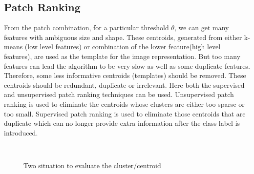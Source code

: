 \subsection{Patch Ranking}

From the patch combination, for a particular threshold $\theta$, we can get many features with ambiguous size and shape. These centroids, generated from either k-means (low level features) or combination of the lower feature(high level features), are used as the template for the image representation. But too many features can lead the algorithm to be very slow as well as some duplicate features. Therefore, some less informative centroids (templates) should be removed. These centroids should be redundant, duplicate or irrelevant. Here both the supervised and unsupervised patch ranking techniques can be used. Unsupervised patch ranking is used to eliminate the centroids whose clusters are either too sparse or too small. Supervised patch ranking is used to eliminate those centroids that are duplicate which can no longer provide extra information after the class label is introduced.

\begin{figure}[t]
  \centering
  \\
  \caption{Two situation to evaluate the cluster/centroid}
\end{figure}

